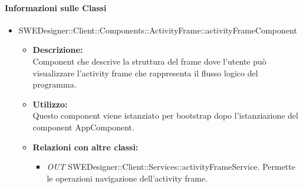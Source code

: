 \begin{itemize}
		\paragraph{Informazioni sulle Classi}
		\begin{itemize}				
		\item SWEDesigner::Client::Components::ActivityFrame::activityFrameComponent
			\begin{itemize}
				\item \textbf{Descrizione: }\\
				Component che descrive la struttura del frame dove l'utente può visualizzare
				l'activity frame che rappresenta il flusso logico del programma.
				\item \textbf{Utilizzo: }\\
				Questo component viene istanziato per bootstrap dopo l'istanziazione
				del component AppComponent.
				\item \textbf{Relazioni con altre classi: }
				\begin{itemize}
				\item \emph{OUT} SWEDesigner::Client::Services::activityFrameService. Permette le operazioni navigazione dell'activity frame.
			\end{itemize}
			\end{itemize}
			
		\end{itemize}
		
		


\end{itemize}

